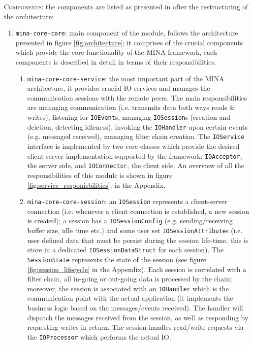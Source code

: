 \textsc{Components}: the components are listed as presented in after the restructuring of the architecture:
\begin{enumerate}
    \item \texttt{mina-core-core}: main component of the module, follows the architecture presented in figure \ref{fig:architecture}; it comprises of the crucial components which provide the core functionality of the MINA framework, each components is described in detail in terms of their responsibilities.
        \begin{enumerate}
            \item \texttt{mina-core-core-service}: the most important part of the MINA architecture, it provides crucial IO services and manages the communication sessions with the remote peers. The main responsibilities are managing communication  (i.e. transmits data both ways reads \& writes), listening for \texttt{IOEvent}s, managing \texttt{IOSession}s (creation and deletion, detecting idleness), invoking the \texttt{IOHandler} upon certain events (e.g. messaged received), managing filter chain creation. The \texttt{IOService} interface is implemented by two core classes which provide the desired client-server implementation supported by the framework: \texttt{IOAcceptor}, the server side, and \texttt{IOConnector}, the client side. An overview of all the responsibilities of this module is shown in figure \ref{fig:service_responisbilities}, in the Appendix.
            \item \texttt{mina-core-core-session}: an \texttt{IOSession} represents a client-server connection (i.e. whenever a client connection is established, a new session is created); a session has a \texttt{IOSessionConfig} (e.g. sending/receiving buffer size, idle time etc.) and some user set \texttt{IOSessionAttribute}s (i.e. user defined data that must be persist during the session life-time, this is store in a dedicated \texttt{IOSessionDataStruct} for each session). The \texttt{SessionState} represents the state of the session (see figure \ref{fig:session_lifecycle} in the Appendix). Each session is correlated with a filter chain, all in-going or out-going data is processed  by the chain; moreover, the session is associated with an \texttt{IOHandler} which is the communication point with the actual application (it implements the business logic based on the messages/events received). The handler will dispatch the messages received from the session, as well as responding by requesting writes in return. The session handles read/write requests via the \texttt{IOProcessor} which performs the actual IO.

\end{enumerate}
\end{enumerate}

